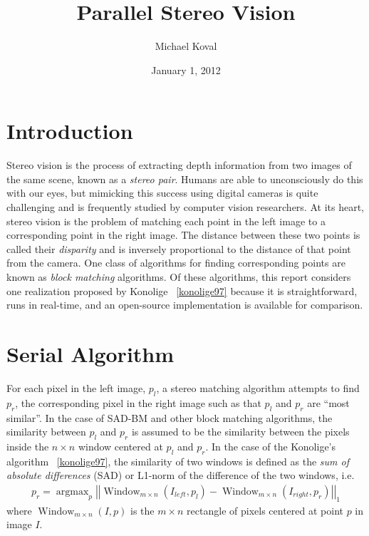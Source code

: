 \documentclass{article}
\title{Parallel Stereo Vision}
\author{Michael Koval}
\date{January 1, 2012}
\DeclareMathOperator*{\argmax}{argmax}
\DeclareMathOperator{\Window}{Window}
\begin{document}
\maketitle

\section{Introduction}
\label{sec:intro}
Stereo vision is the process of extracting depth information from two images of
the same scene, known as a \textit{stereo pair}. Humans are able to
unconsciously do this with our eyes, but mimicking this success using digital
cameras is quite challenging and is frequently studied by computer vision
researchers. At its heart, stereo vision is the problem of matching each point
in the left image to a corresponding point in the right image. The distance
between these two points is called their \textit{disparity} and is inversely
proportional to the distance of that point from the camera. One class of
algorithms for finding corresponding points are known as \textit{block
matching} algorithms. Of these algorithms, this report considers one
realization proposed by Konolige ~\ref{konolige97} because it is
straightforward, runs in real-time, and an open-source implementation is
available for comparison.

\section{Serial Algorithm}
\label{sec:serial}
For each pixel in the left image, $p_l$, a stereo matching algorithm attempts
to find $p_r$, the corresponding pixel in the right image such as that $p_l$
and $p_r$ are ``most similar''. In the case of SAD-BM and other block matching
algorithms, the similarity between $p_l$ and $p_r$ is assumed to be the
similarity between the pixels inside the $n \times n$ window centered at $p_l$
and $p_r$. In the case of the Konolige's algorithm ~\ref{konolige97}, the
similarity of two windows is defined as the \textit{sum of absolute
differences} (SAD) or L1-norm of the difference of the two windows, i.e.
\begin{align*}
    p_r = \argmax_p \left|\left|\Window_{m \times n}(I_{left}, p_l)
          - \Window_{m \times n}(I_{right}, p_r)\right|\right|_1
\end{align*}
where $\Window_{m \times n}(I, p)$ is the $m \times n$ rectangle of pixels
centered at point $p$ in image $I$.
\end{document}
